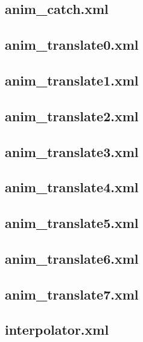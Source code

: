 \documentclass[11pt,a4j]{jarticle}
\begin{document}
\subsection{anim\_catch.xml}
	
	\newpage
\subsection{anim\_translate0.xml}
	
	\newpage
\subsection{anim\_translate1.xml}
	
	\newpage
\subsection{anim\_translate2.xml}
	
	\newpage
\subsection{anim\_translate3.xml}
	
	\newpage
\subsection{anim\_translate4.xml}
	
	\newpage
\subsection{anim\_translate5.xml}
	
	\newpage
\subsection{anim\_translate6.xml}
	
	\newpage
\subsection{anim\_translate7.xml}
	
	\newpage
\subsection{interpolator.xml}
	
	\newpage
	
\end{document}
